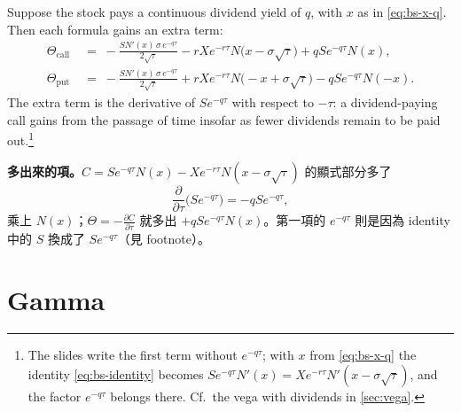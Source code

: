 \suppstart
{}
\suppend

Suppose the stock pays a continuous dividend yield of $q$, with $x$ as in \eqref{eq:bs-x-q}.
Then each formula gains an extra term:
\begin{align*}
	\Theta_{\text{call}} & \;=\; -\frac{SN'(x)\,\sigma\,e^{-q\tau}}{2\sqrt{\tau}}-rXe^{-r\tau}N\bigl(x-\sigma\sqrt{\tau}\bigr)+qSe^{-q\tau}N(x) , \\
	\Theta_{\text{put}}  & \;=\; -\frac{SN'(x)\,\sigma\,e^{-q\tau}}{2\sqrt{\tau}}+rXe^{-r\tau}N\bigl(-x+\sigma\sqrt{\tau}\bigr)-qSe^{-q\tau}N(-x) .
\end{align*}
\suppstart
The extra term is the derivative of $Se^{-q\tau}$ with respect to $-\tau$: a dividend-paying call gains from the passage of time insofar as fewer dividends remain to be paid out.\footnote{The slides write the first term without $e^{-q\tau}$; with $x$ from \eqref{eq:bs-x-q} the identity \eqref{eq:bs-identity} becomes $Se^{-q\tau}N'(x)=Xe^{-r\tau}N'(x-\sigma\sqrt{\tau})$, and the factor $e^{-q\tau}$ belongs there. Cf.\ the vega with dividends in \autoref{sec:vega}.}


\begin{remark}[補充]
	\textbf{多出來的項。}$C=Se^{-q\tau}N(x)-Xe^{-r\tau}N(x-\sigma\sqrt{\tau})$ 的顯式部分多了
	\[
		\frac{\partial}{\partial\tau}\bigl(Se^{-q\tau}\bigr)=-qSe^{-q\tau} ,
	\]
	乘上 $N(x)$；$\Theta=-\frac{\partial C}{\partial\tau}$ 就多出 $+qSe^{-q\tau}N(x)$。第一項的 $e^{-q\tau}$ 則是因為 identity 中的 $S$ 換成了 $Se^{-q\tau}$（見 footnote）。
\end{remark}
\suppend

\section{Gamma}
\label{sec:gamma}


